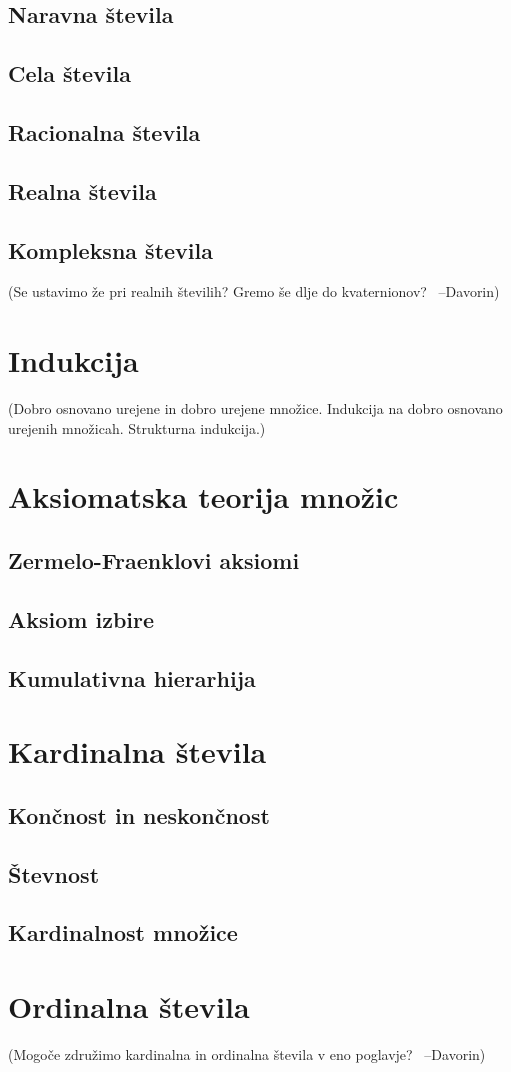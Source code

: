 \documentclass[11pt,a4paper,twoside]{book}
\newcommand{\davorin}[1]{{\small\textcolor{davorincolor}{(#1 \ \mbox{--Davorin})}}}
\newcommand{\note}[1]{{\small\textcolor{notecolor}{(#1)}}}
\begin{document}
                \section{Naravna števila}
                \section{Cela števila}
                \section{Racionalna števila}
                \section{Realna števila}
                \section{Kompleksna števila}
                        \davorin{Se ustavimo že pri realnih številih? Gremo še dlje do kvaternionov?}
        
        \chapter{Indukcija}
                \note{Dobro osnovano urejene in dobro urejene množice. Indukcija na dobro osnovano urejenih množicah. Strukturna indukcija.}
        
        \chapter{Aksiomatska teorija množic}
                \section{Zermelo-Fraenklovi aksiomi}
                \section{Aksiom izbire}
                \section{Kumulativna hierarhija}
        
        \chapter{Kardinalna števila}
                \section{Končnost in neskončnost}
                \section{Števnost}
                \section{Kardinalnost množice}
        
        \chapter{Ordinalna števila}
                \davorin{Mogoče združimo kardinalna in ordinalna števila v eno poglavje?}
        
        
\end{document}
